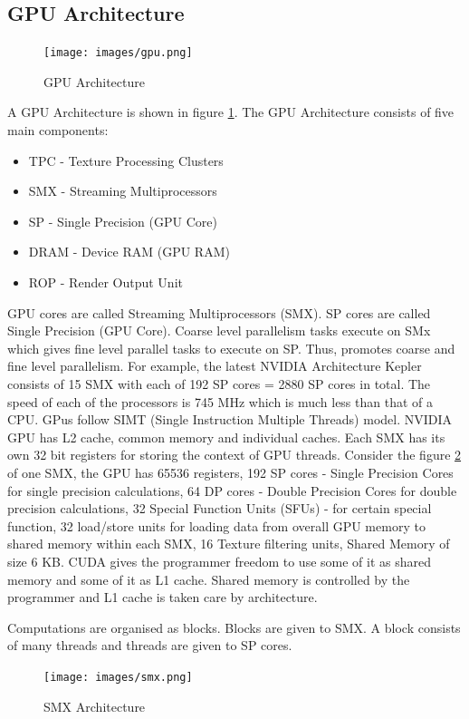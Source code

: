 \documentclass[12pt]{article}
\begin{document}
\subsection{GPU Architecture}
\begin{figure}[H]
    \centering
    \texttt{[image: images/gpu.png]}
    \caption{GPU Architecture}
    \label{fig:gpu}
\end{figure}
A GPU Architecture is shown in figure \ref{fig:gpu}.
The GPU Architecture consists of five main components:
\begin{itemize}
    \item TPC - Texture Processing Clusters
    \item SMX - Streaming Multiprocessors
    \item SP - Single Precision (GPU Core)
    \item DRAM - Device RAM (GPU RAM)
    \item ROP - Render Output Unit
\end{itemize}
GPU cores are called Streaming Multiprocessors (SMX).
SP cores are called Single Precision (GPU Core).
Coarse level parallelism tasks execute on SMx which gives fine level parallel tasks to execute on SP.
Thus, promotes coarse and fine level parallelism. For example, the latest NVIDIA Architecture 
Kepler consists of 15 SMX with each of 192 SP cores = 2880 SP cores in total.
The speed of each of the processors is 745 MHz which is much less than that of a CPU.
GPus follow SIMT (Single Instruction Multiple Threads) model.
NVIDIA GPU has L2 cache, common memory and individual caches. Each SMX has its own 32 bit registers
for storing the context of GPU threads. 
Consider the figure \ref{fig:smx} of one SMX, 
the GPU has 65536 registers, 192 SP cores - Single Precision Cores for single precision calculations,
64 DP cores - Double Precision Cores for double precision calculations, 32 Special Function Units (SFUs) -
for certain special function, 32 load/store units for loading data from overall GPU memory to shared memory within 
each SMX, 16 Texture filtering units, Shared Memory of size 6 KB. CUDA gives the programmer freedom to use some of it as shared memory
and some of it as L1 cache. Shared memory is controlled by the programmer and L1 cache is taken care by architecture.

Computations are organised as blocks. Blocks are given to SMX. A block consists of many threads and threads are given to SP cores.
\begin{figure}[H]
    \centering
    \texttt{[image: images/smx.png]}
    \caption{SMX Architecture}
    \label{fig:smx}
\end{figure}
\end{document}
